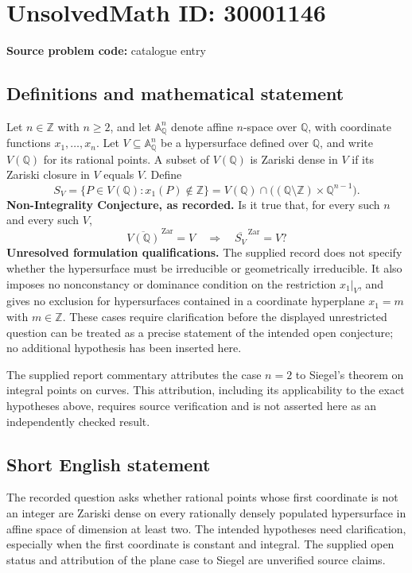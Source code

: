 \documentclass[11pt]{article}
\newcommand{\Z}{\mathbb{Z}}
\newcommand{\Q}{\mathbb{Q}}
\newcommand{\A}{\mathbb{A}}
\begin{document}
\section*{UnsolvedMath ID: 30001146}
\textbf{Source problem code:} catalogue entry
\subsection{Definitions and mathematical statement}
Let \(n\in\Z\) with \(n\geq 2\), and let \(\A^n_{\Q}\) denote affine \(n\)-space over \(\Q\), with coordinate functions \(x_1,\ldots,x_n\). Let \(V\subseteq\A^n_{\Q}\) be a hypersurface defined over \(\Q\), and write \(V(\Q)\) for its rational points. A subset of \(V(\Q)\) is Zariski dense in \(V\) if its Zariski closure in \(V\) equals \(V\). Define
\[
S_V=\{P\in V(\Q):x_1(P)\notin\Z\}
=V(\Q)\cap\bigl((\Q\setminus\Z)\times\Q^{n-1}\bigr).
\]
\textbf{Non-Integrality Conjecture, as recorded.} Is it true that, for every such \(n\) and every such \(V\),
\[
\overline{V(\Q)}^{\,\mathrm{Zar}}=V
\quad\Longrightarrow\quad
\overline{S_V}^{\,\mathrm{Zar}}=V?
\]
\textbf{Unresolved formulation qualifications.} The supplied record does not specify whether the hypersurface must be irreducible or geometrically irreducible. It also imposes no nonconstancy or dominance condition on the restriction \(x_1|_V\), and gives no exclusion for hypersurfaces contained in a coordinate hyperplane \(x_1=m\) with \(m\in\Z\). These cases require clarification before the displayed unrestricted question can be treated as a precise statement of the intended open conjecture; no additional hypothesis has been inserted here.

The supplied report commentary attributes the case \(n=2\) to Siegel's theorem on integral points on curves. This attribution, including its applicability to the exact hypotheses above, requires source verification and is not asserted here as an independently checked result.
\subsection{Short English statement}
The recorded question asks whether rational points whose first coordinate is not an integer are Zariski dense on every rationally densely populated hypersurface in affine space of dimension at least two. The intended hypotheses need clarification, especially when the first coordinate is constant and integral. The supplied open status and attribution of the plane case to Siegel are unverified source claims.
\end{document}
